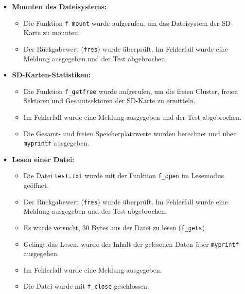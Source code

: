 \begin{itemize}
    \item \textbf{Mounten des Dateisystems:}
    \begin{itemize}
        \item Die Funktion \texttt{f\_mount} wurde aufgerufen, um das Dateisystem der SD-Karte zu mounten.
        \item Der Rückgabewert (\texttt{fres}) wurde überprüft. Im Fehlerfall wurde eine Meldung ausgegeben und der Test abgebrochen.
    \end{itemize}

    \item \textbf{SD-Karten-Statistiken:}
    \begin{itemize}
        \item Die Funktion \texttt{f\_getfree} wurde aufgerufen, um die freien Cluster, freien Sektoren und Gesamtsektoren der SD-Karte zu ermitteln.
        \item Im Fehlerfall wurde eine Meldung ausgegeben und der Test abgebrochen.
        \item Die Gesamt- und freien Speicherplatzwerte wurden berechnet und über \texttt{myprintf} ausgegeben.
    \end{itemize}

    \item \textbf{Lesen einer Datei:}
    \begin{itemize}
        \item Die Datei \texttt{test.txt} wurde mit der Funktion \texttt{f\_open} im Lesemodus geöffnet.
        \item Der Rückgabewert (\texttt{fres}) wurde überprüft. Im Fehlerfall wurde eine Meldung ausgegeben und der Test abgebrochen.
        \item Es wurde versucht, 30 Bytes aus der Datei zu lesen (\texttt{f\_gets}).
        \item Gelingt das Lesen, wurde der Inhalt der gelesenen Daten über \texttt{myprintf} ausgegeben.
        \item Im Fehlerfall wurde eine Meldung ausgegeben.
        \item Die Datei wurde mit \texttt{f\_close} geschlossen.
    \end{itemize}


\end{itemize}
